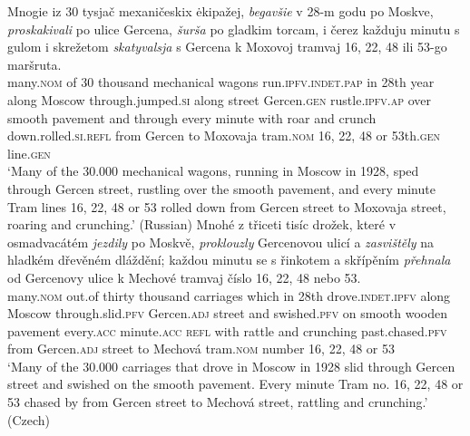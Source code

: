 \documentclass[output=paper,colorlinks,citecolor=brown]{langscibook}
\begin{document}
\ea\label{28}	
\ea	
\gll Mnogie iz 30 tysjač mexaničeskix ėkipažej, \textit{begavšie} v 28-m godu po Moskve, \textit{proskakivali} po ulice Gercena, \textit{šurša} po gladkim torcam, i čerez každuju minutu s gulom i skrežetom \textit{skatyvalsja} s Gercena k Moxovoj tramvaj {16, 22, 48} ili 53-go maršruta. \\
 	many.\textsc{nom} of 30 thousand mechanical wagons run.\textsc{ipfv.indet.pap} in 28th year along Moscow through.jumped.\textsc{si} along street  Gercen.\textsc{gen} rustle.\textsc{ipfv.ap} over smooth pavement and through every minute with roar and crunch down.rolled.\textsc{si.refl} from Gercen to Moxovaja tram.\textsc{nom} {16, 22, 48} or 53th.\textsc{gen} line.\textsc{gen}\\
\glt `Many of the 30.000 mechanical wagons, running in Moscow in 1928, sped through Gercen street, rustling over the smooth pavement, and every minute Tram lines 16, 22, 48 or 53 rolled down from Gercen street to Moxovaja street, roaring and crunching.' \hfill (Russian)%
\ex\label{ex:jezdily}	
\gll Mnohé z třiceti tisíc drožek, které v osmadvacátém \textit{jezdily} po Moskvě, \textit{proklouzly} Gercenovou ulicí a \textit{zasvištěly} na hladkém dřevěném dláždění; každou minutu se s řinkotem a skřípěním \textit{přehnala} od Gercenovy ulice k Mechové tramvaj číslo {16, 22, 48} nebo 53.\\
 	many.\textsc{nom} out.of thirty thousand carriages which in 28th drove.\textsc{indet.ipfv} along Moscow through.slid.\textsc{pfv} Gercen.\textsc{adj} street  and swished.\textsc{pfv} on smooth wooden pavement every.\textsc{acc} minute.\textsc{acc} \textsc{refl} with rattle and crunching past.chased.\textsc{pfv} from Gercen.\textsc{adj} street to Mechová  tram.\textsc{nom} number {16, 22, 48} or 53 \\
	\glt `Many of the 30.000 carriages that drove in Moscow in 1928 slid through Gercen street and swished on the smooth pavement. Every minute Tram no. 16, 22, 48 or 53 chased by from Gercen street to Mechová street, rattling and crunching.' \hfill (Czech)
\z 
\z 
\end{document}
